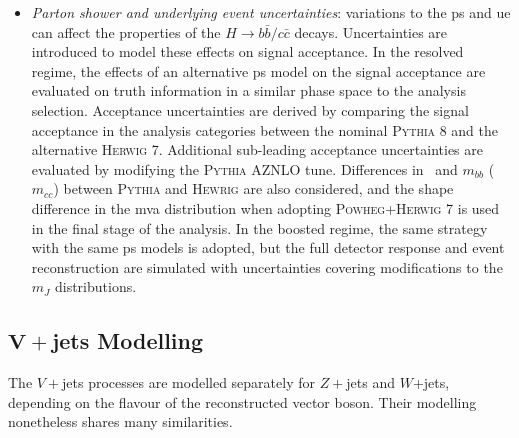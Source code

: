 \begin{itemize}[leftmargin=*]
    \item \textit{Parton shower and underlying event uncertainties}: variations to the \gls{ps} and \gls{ue} can affect the properties of the $H \rightarrow b\bar{b} / c\bar{c}$ decays. Uncertainties are introduced to model these effects on signal acceptance. In the resolved regime, the effects of an alternative \gls{ps} model on the signal acceptance are evaluated on truth information in a similar phase space to the analysis selection. Acceptance uncertainties are derived by comparing the signal acceptance in the analysis categories between the nominal \textsc{Pythia} 8 and the alternative \textsc{Herwig} 7. Additional sub-leading acceptance uncertainties are evaluated by modifying the \textsc{Pythia} AZNLO tune. Differences in \ptv\ and $m_{bb}$ ($m_{cc}$) between \textsc{Pythia} and \textsc{Hewrig} are also considered, and the shape difference in the \gls{mva} distribution when adopting \textsc{Powheg}+\textsc{Herwig} 7 is used in the final stage of the analysis. In the boosted regime, the same strategy with the same \gls{ps} models is adopted, but the full detector response and event reconstruction are simulated with uncertainties covering modifications to the $m_J$ distributions.
\end{itemize}

\subsection[$V+$jets Modelling]{$\boldsymbol{V+}$jets Modelling}\label{sec-modVjet}
The $V+$jets processes are modelled separately for $Z+$jets and $W$+jets, depending on the flavour of the reconstructed vector boson. Their modelling nonetheless shares many similarities.

